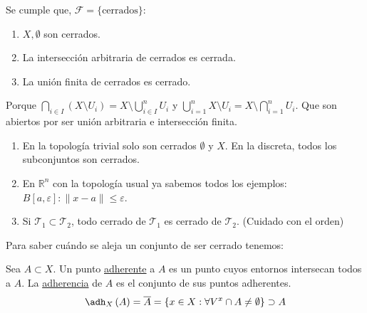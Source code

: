 \begin{prop}
Se cumple que, $\mathcal{F} = \{\text{cerrados}\}$:
\begin{enumerate}
    \item $X, \emptyset$ son cerrados.
    \item La intersección arbitraria de cerrados es cerrada.
    \item La unión finita de cerrados es cerrado.
\end{enumerate}
\begin{demo}
    Porque $\bigcap_{i \in  I} \left( X \setminus U_i \right) = X \setminus \bigcup_{i \in I}^n U_i$ y $\bigcup_{i = 1}^n X \setminus U_i = X \setminus \bigcap_{i = 1}^n U_i$. Que son abiertos por ser unión arbitraria e intersección finita.
\end{demo}
\end{prop}

\begin{ej}
\begin{enumerate}
    \item En la topología trivial solo son cerrados $\emptyset$ y $X$. En la discreta, todos los subconjuntos son cerrados.
    \item En $\mathbb{R}^n$ con la topología usual ya sabemos todos los ejemplos: $B\left[ a, \varepsilon \right] : \lVert x - a \rVert \le \varepsilon$.
    \item Si $\mathcal{T}_1 \subset \mathcal{T}_2$, todo cerrado de $\mathcal{T}_1$ es cerrado de $\mathcal{T}_2$. (Cuidado con el orden) 
\end{enumerate}
\end{ej}

Para saber cuándo se aleja un conjunto de ser cerrado tenemos:
\begin{defi}
Sea $A \subset X$. Un punto \underline{adherente} a $A$ es un punto cuyos entornos intersecan todos a $A$. La \underline{adherencia} de $A$ es el conjunto de sus puntos adherentes. 
\[
\adh_X\left( A \right) = \overline{A} = \{x \in X: \forall V^x \cap A \neq \emptyset\} \supset A
\]
\end{defi}


